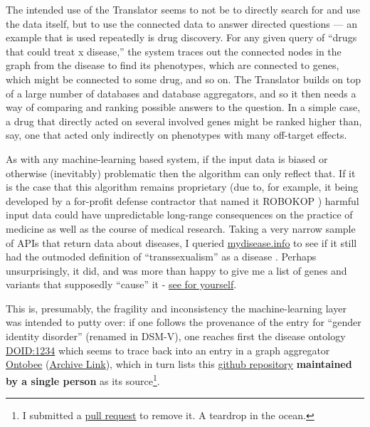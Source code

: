 \documentclass[notoc]{tufte-book}
\begin{document}
The intended use of the Translator seems to not be to directly search
for and use the data itself, but to use the connected data to answer
directed questions \citep{goelExplanationContainerCaseBased2021} 
--- an example that is used repeatedly is drug discovery. For any given
query of ``drugs that could treat x disease,'' the system traces out the
connected nodes in the graph from the disease to find its phenotypes,
which are connected to genes, which might be connected to some drug, and
so on. The Translator builds on top of a large number of databases and
database aggregators, and so it then needs a way of comparing and
ranking possible answers to the question. In a simple case, a drug that
directly acted on several involved genes might be ranked higher than,
say, one that acted only indirectly on phenotypes with many off-target
effects.

As with any machine-learning based system, if the input data is biased
or otherwise (inevitably) problematic then the algorithm can only
reflect that. If it is the case that this algorithm remains proprietary
(due to, for example, it being developed by a for-profit defense
contractor that named it ROBOKOP \citep{ROBOKOPCoVar2021} )
harmful input data could have unpredictable long-range consequences on
the practice of medicine as well as the course of medical research.
Taking a very narrow sample of APIs that return data about diseases, I
queried \href{https://mydisease.info}{mydisease.info} to see if it still
had the outmoded definition of ``transsexualism'' as a disease \citep{ramTransphobiaEncodedExamination2021} . Perhaps unsurprisingly, it
did, and was more than happy to give me a list of genes and variants
that supposedly ``cause'' it -
\href{http://mydisease.info/v1/query?q=\%22DOID\%3A10919\%22}{see for
yourself}.

This is, presumably, the fragility and inconsistency the
machine-learning layer was intended to putty over: if one follows the
provenance of the entry for ``gender identity disorder'' (renamed in
DSM-V), one reaches first the disease ontology
\href{https://web.archive.org/web/20211007053446/https://www.ebi.ac.uk/ols/ontologies/doid/terms?iri=http\%3A\%2F\%2Fpurl.obolibrary.org\%2Fobo\%2FDOID_1234}{DOID:1234}
which seems to trace back into an entry in a graph aggregator
\href{http://www.ontobee.org/ontology/DOID?iri=http://purl.obolibrary.org/obo/DOID_1234}{Ontobee}
(\href{https://web.archive.org/web/20210923110103/http://www.ontobee.org/ontology/DOID?iri=http://purl.obolibrary.org/obo/DOID_1234}{Archive
Link}), which in turn lists this
\href{https://github.com/jannahastings/mental-functioning-ontology}{github
repository} \textbf{maintained by a single person} as its
source\footnote{I submitted a
  \href{https://github.com/jannahastings/mental-functioning-ontology/pull/8}{pull
  request} to remove it. A teardrop in the ocean.}.
\end{document}
